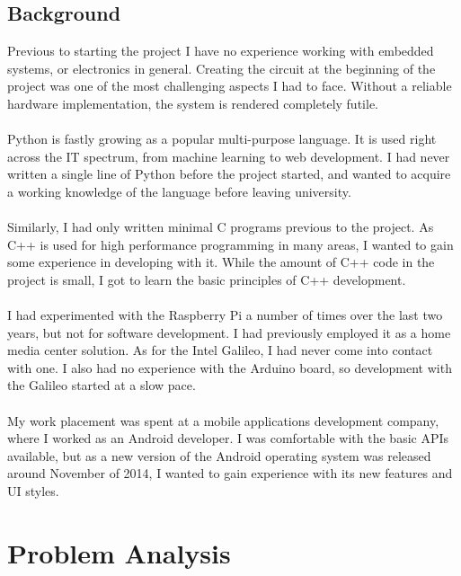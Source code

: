 \documentclass{article}
\begin{document}
\subsection{Background}
Previous to starting the project I have no experience working with embedded systems, or electronics in general. Creating the circuit at the beginning of the project was one of the most challenging aspects I had to face. Without a reliable hardware implementation, the system is rendered completely futile.\\\\
Python is fastly growing as a popular multi-purpose language. It is used right across the IT spectrum, from machine learning to web development. I had never written a single line of Python before the project started, and wanted to acquire a working knowledge of the language before leaving university. \\\\
Similarly, I had only written minimal C programs previous to the project. As C++ is used for high performance programming in many areas, I wanted to gain some experience in developing with it. While the amount of C++ code in the project is small, I got to learn the basic principles of C++ development. \\\\
I had experimented with the Raspberry Pi a number of times over the last two years, but not for software development. I had previously employed it as a home media center solution. As for the Intel Galileo, I had never come into contact with one. I also had no experience with the Arduino board, so development with the Galileo started at a slow pace.  \\\\
My work placement was spent at a mobile applications development company, where I worked as an Android developer. I was comfortable with the basic APIs available, but as a new version of the Android operating system was released around November of 2014, I wanted to gain experience with its new features and UI styles. 

\newpage
\section{Problem Analysis}
\end{document}
